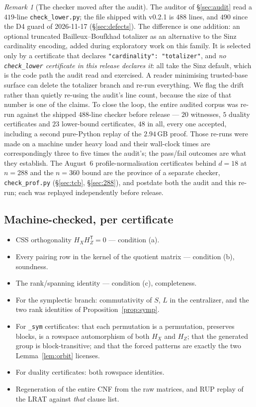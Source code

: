 \documentclass[11pt]{amsart}
\newcommand{\HX}{H_{X}}
\newcommand{\HZ}{H_{Z}}
\theoremstyle{plain}
\theoremstyle{definition}
\theoremstyle{remark}
\newtheorem{remark}[theorem]{Remark}
\begin{document}
\begin{remark}[The checker moved after the audit]\label{rem:checkerdrift}
The auditor of \S\ref{sec:audit} read a $419$-line
\texttt{check\_lower.py}; the file shipped with v0.2.1 is $488$ lines, and
$490$ since the D4 guard of 2026-11-17 (\S\ref{sec:defects}).
The difference is one addition: an optional truncated Bailleux--Boufkhad
totalizer as an alternative to the Sinz cardinality encoding, added during
exploratory work on this family. It is selected only by a certificate that
declares \texttt{"cardinality": "totalizer"}, and \emph{no \texttt{check\_lower}
certificate in this release declares it}: all take the Sinz default, which is
the code path the audit read and exercised. A reader minimising trusted-base
surface can delete the totalizer branch and re-run everything. We flag the
drift rather than quietly re-using the audit's line count, because the size of
that number is one of the claims. To close the loop, the entire audited corpus
was re-run against the shipped $488$-line checker before release --- $20$
witnesses, $5$ duality certificates and $23$ lower-bound certificates, $48$ in
all, every one accepted, including a second pure-Python replay of the
$2.94$\,GB proof. Those re-runs were made on a machine under heavy load and
their wall-clock times are correspondingly three to five times the audit's; the
pass/fail outcomes are what they establish. The August~6 profile-normalisation
certificates behind $d=18$ at $n=288$ and the $n=360$ bound are the province of
a separate checker, \texttt{check\_prof.py} (\S\ref{sec:tcb}, \S\ref{sec:288}),
and postdate both the audit and this re-run; each was replayed independently
before release.
\end{remark}

\subsection{Machine-checked, per certificate}
\begin{itemize}
\item CSS orthogonality $\HX\HZ^{\mathsf T}=0$ --- condition (a).
\item Every pairing row in the kernel of the quotient matrix --- condition (b),
soundness.
\item The rank/spanning identity --- condition (c), completeness.
\item For the symplectic branch: commutativity of $S$, $L$ in the centralizer,
and the two rank identities of Proposition~\ref{prop:symp}.
\item For \texttt{\_sym} certificates: that each permutation is a permutation,
preserves blocks, is a rowspace automorphism of both $\HX$ and $\HZ$; that the
generated group is block-transitive; and that the forced patterns are exactly
the two Lemma~\ref{lem:orbit} licenses.
\item For duality certificates: both rowspace identities.
\item Regeneration of the entire CNF from the raw matrices, and RUP replay of
the LRAT against \emph{that} clause list.
\end{itemize}
\end{document}
